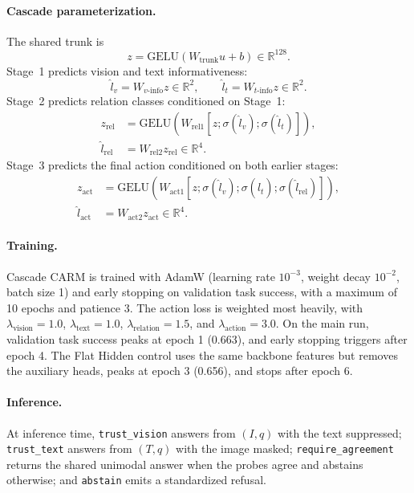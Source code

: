 \documentclass[11pt]{article}
\begin{document}
\paragraph{Cascade parameterization.}
The shared trunk is
\[
z = \mathrm{GELU}(W_{\text{trunk}}u + b) \in \mathbb{R}^{128}.
\]
Stage~1 predicts vision and text informativeness:
\[
\hat{l}_v = W_{v\text{-info}}z \in \mathbb{R}^2,
\qquad
\hat{l}_t = W_{t\text{-info}}z \in \mathbb{R}^2.
\]
Stage~2 predicts relation classes conditioned on Stage~1:
\begin{align*}
z_{\text{rel}} &=
\mathrm{GELU}(W_{\text{rel1}}[z;\sigma(\hat{l}_v);\sigma(\hat{l}_t)]), \\
\hat{l}_{\text{rel}} &= W_{\text{rel2}}z_{\text{rel}} \in \mathbb{R}^4.
\end{align*}
Stage~3 predicts the final action conditioned on both earlier stages:
\begin{align*}
z_{\text{act}} &=
\mathrm{GELU}(W_{\text{act1}}[z;\sigma(\hat{l}_v);\sigma(\hat{l}_t);\sigma(\hat{l}_{\text{rel}})]), \\
\hat{l}_{\text{act}} &= W_{\text{act2}}z_{\text{act}} \in \mathbb{R}^4.
\end{align*}

\paragraph{Training.}
Cascade CARM is trained with AdamW (learning rate $10^{-3}$, weight decay $10^{-2}$,
batch size 1) and early stopping on validation task success, with a maximum of 10 epochs
and patience 3. The action loss is weighted most heavily, with
$\lambda_{\text{vision}} = 1.0$, $\lambda_{\text{text}} = 1.0$,
$\lambda_{\text{relation}} = 1.5$, and $\lambda_{\text{action}} = 3.0$. On the main run,
validation task success peaks at epoch 1 (0.663), and early stopping triggers after epoch
4. The Flat Hidden control uses the same backbone features but removes the auxiliary heads,
peaks at epoch 3 (0.656), and stops after epoch 6.

\paragraph{Inference.}
At inference time, \texttt{trust\_vision} answers from $(I,q)$ with the text suppressed;
\texttt{trust\_text} answers from $(T,q)$ with the image masked;
\texttt{require\_agreement} returns the shared unimodal answer when the probes agree and
abstains otherwise; and \texttt{abstain} emits a standardized refusal.
\end{document}
